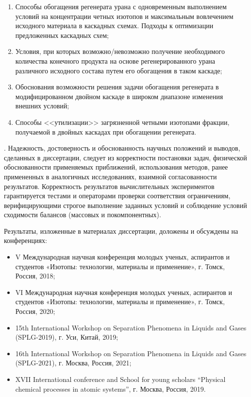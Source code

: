 {}
\begin{enumerate}
  \item Способы обогащения регенерата урана с одновременным выполнением условий на концентрации четных изотопов и максимальным вовлечением исходного материала в каскадных схемах. Подходы к оптимизации предложенных каскадных схем;
  \item Условия, при которых возможно/невозможно получение необходимого количества конечного продукта на основе регенерированного урана различного исходного состава путем его обогащения в таком каскаде;
  \item Обоснования возможности решения задачи обогащения регенерата в модифицированном двойном каскаде в широком диапазоне изменения внешних условий;
  \item Способы <<утилизации>> загрязненной четными изотопами фракции, получаемой в двойных каскадах при обогащении регенерата. 
\end{enumerate}

{\reliability}.
Надежность, достоверность и обоснованность научных положений и выводов, сделанных в диссертации, следует из корректности постановки задач, физической обоснованности применяемых приближений, использования методов, ранее примененных в аналогичных исследованиях, взаимной согласованности результатов. Корректность результатов вычислительных экспериментов гарантируется тестами и операторами проверки соответствия ограничениям, верифицирующими строгое выполнение заданных условий и соблюдение условий сходимости балансов (массовых и покомпонентных).

{\probation}
Результаты, изложенные в материалах диссертации, доложены и обсуждены на конференциях:
\begin{itemize}
  \item V Международная научная конференция молодых ученых, аспирантов и студентов «Изотопы: технологии, материалы и применение», г. Томск, Россия, 2018;
  \item VI Международная научная конференция молодых ученых, аспирантов и студентов «Изотопы: технологии, материалы и применение», г. Томск, Россия, 2020;
  \item 15th International Workshop on Separation Phenomena in Liquids and Gases (SPLG-2019), г. Уси, Китай, 2019;
  \item 16th International Workshop on Separation Phenomena in Liquids and Gases (SPLG-2021), г. Москва, Россия, 2021;
  \item XVII International conference and School for young scholars “Physical chemical processes in atomic systems”, г. Москва, Россия, 2019.
\end{itemize}


